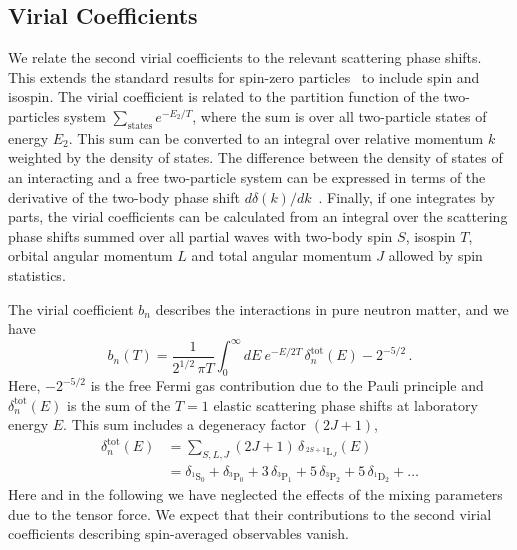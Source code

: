 \documentclass[aps,prc,twocolumn,showpacs,showkeys,amsmath,amssymb]{revtex4}
\begin{document}
\subsection{Virial Coefficients}

We relate the second virial coefficients to the relevant scattering 
phase shifts. This extends the standard results for spin-zero 
particles~\cite{b2} to include spin and isospin. The virial coefficient 
is related to the partition function of the two-particles system 
$\sum_{\text{states}} e^{-E_{2}/T}$, where the sum is over all 
two-particle states of energy $E_{2}$.  This sum can be converted to an
integral over relative momentum $k$ weighted by the density of states.  
The difference between the density of states of an interacting
and a free two-particle system can be expressed in terms of the derivative 
of the two-body phase shift $d\delta(k)/dk$~\cite{b2,huang}.  Finally,
if one integrates by parts, the virial coefficients can be calculated from
an integral over the scattering phase shifts summed over all partial waves
with two-body spin $S$, isospin $T$, orbital angular momentum $L$ and total 
angular momentum $J$ allowed by spin statistics.

The virial coefficient $b_n$ describes the interactions in pure neutron 
matter, and we have
\begin{equation}
b_n(T)=\frac{1}{2^{1/2}\,\pi T} \int_0^\infty dE \: e^{-E/2T} \, 
\delta^{\text{tot}}_n(E) - 2^{-5/2} \,.
\label{bn}
\end{equation}
Here, $-2^{-5/2}$ is the free Fermi gas contribution due to the Pauli 
principle and 
$\delta^{\text{tot}}_n(E)$ is the sum of the $T=1$ elastic scattering
phase shifts at laboratory energy $E$. This sum includes a degeneracy 
factor $(2J+1)$,
\begin{align}
\delta^{\text{tot}}_n(E) &= \sum_{S,L,J} (2J+1) \, 
\delta_{\,^{2S+1}\text{L}_J}(E)
\nonumber \\[1mm]
&=\delta_{^1\text{S}_0}+\delta_{^3\text{P}_0}+3\,\delta_{^3\text{P}_1}
+5\,\delta_{^3\text{P}_2}+5\,\delta_{^1\text{D}_2}+ \ldots
\label{deltantot}
\end{align}
Here and in the following we have neglected the effects of the mixing
parameters due to the tensor force. We expect that their contributions
to the second virial coefficients describing spin-averaged observables
vanish.
\end{document}
